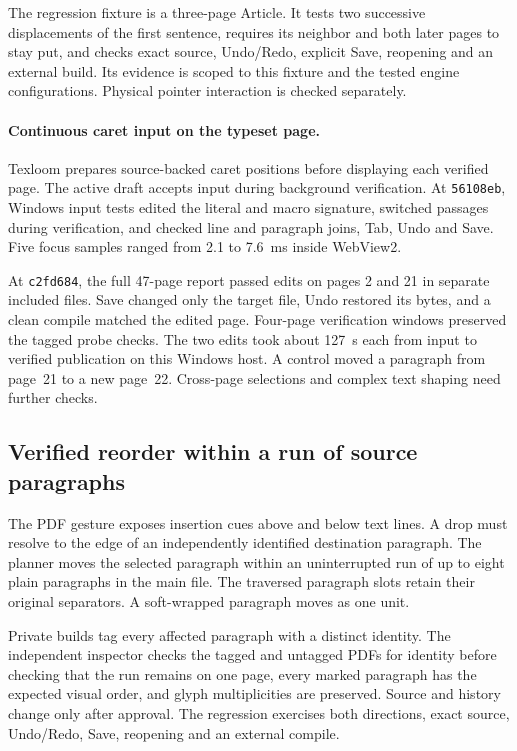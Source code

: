 The regression fixture is a three-page Article. It tests two successive
displacements of the first sentence, requires its neighbor and both later
pages to stay put, and checks exact source, Undo/Redo, explicit
Save, reopening and an external build. Its evidence is scoped to this fixture
and the tested engine configurations. Physical pointer interaction is
checked separately.

\paragraph{Continuous caret input on the typeset page.}
Texloom prepares source-backed caret positions before displaying each
verified page. The active draft accepts input during background verification.
At \texttt{56108eb}, Windows input tests edited the literal and macro
signature, switched passages during verification, and checked line and
paragraph joins, Tab, Undo and Save. Five focus samples ranged from
2.1 to 7.6~ms inside WebView2.

At \texttt{c2fd684}, the full 47-page report passed edits on pages 2 and 21
in separate included files. Save changed only the target file, Undo
restored its bytes, and a clean compile matched the edited page. Four-page
verification windows preserved the tagged probe checks. The two edits took
about 127~s each from input to verified publication on this Windows host.
A control moved a paragraph from page~21 to a new page~22.
Cross-page selections and complex text shaping need further checks.

\subsection{Verified reorder within a run of source paragraphs}
The PDF gesture exposes insertion cues above and below text lines. A
drop must resolve to the edge of an independently identified destination
paragraph. The planner moves the selected paragraph within an uninterrupted
run of up to eight plain paragraphs in the main file. The traversed paragraph
slots retain their original separators. A soft-wrapped paragraph moves as
one unit.

Private builds tag every affected paragraph with a distinct identity. The
independent inspector checks the tagged and untagged PDFs for identity before
checking that the run remains on one page, every marked paragraph has the
expected visual order, and glyph multiplicities are preserved. Source and
history change only after approval. The regression exercises both directions,
exact source, Undo/Redo, Save, reopening and an external compile.


